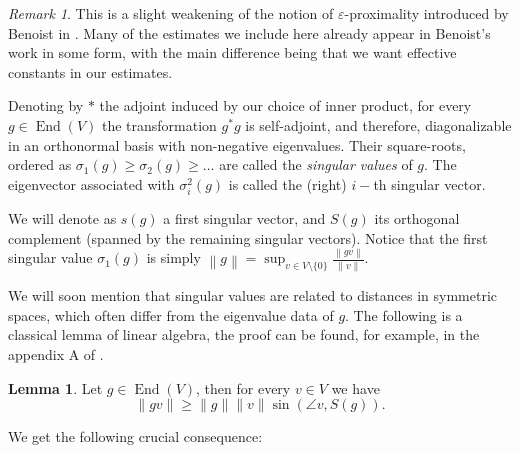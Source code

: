 \documentclass{amsart}
\DeclareMathOperator{\End}{End}
\newcommand{\norm}[1]{\left\lVert#1\right\rVert}
\theoremstyle{remark}
\newtheorem{rmk}[thm]{Remark}
\theoremstyle{definition}
\newtheorem{lem}[thm]{Lemma}
\begin{document}
\begin{rmk}
 This is a slight weakening of the notion of $\varepsilon$-proximality introduced by Benoist in \cite{benoist_actions_1996}.
 Many of the estimates we include here already appear in Benoist's work in some form, with the main difference being that we want effective constants in our estimates.
\end{rmk}

Denoting by $*$ the adjoint induced by our choice of inner product, for every $g \in \End(V)$ the transformation $g^* g$ is self-adjoint, and therefore, diagonalizable in an orthonormal basis with non-negative eigenvalues.
Their square-roots, ordered as $\sigma_1 (g) \geq \sigma_2 (g) \geq \ldots$ are called the \emph{singular values} of $g$.
The eigenvector associated with $\sigma_i^2 (g)$ is called the (right) $i-$th singular vector.

We will denote as $s (g)$ a first singular vector, and $S(g)$ its orthogonal complement (spanned by the remaining singular vectors).
Notice that the first singular value $\sigma_1 (g)$ is simply $\norm{g} = \sup_{v \in V \setminus \{0\}} \frac{\norm{gv}}{\norm{v}}$.

We will soon mention that singular values are related to distances in symmetric spaces, which often differ from the eigenvalue data of $g$.
The following is a classical lemma of linear algebra, the proof can be found, for example, in the appendix A of \cite{bochi2019anosov}.

\begin{lem}
\label{lemma:bps}
 Let $g \in \End (V)$, then for every $v \in V$ we have
    $$\|gv\| \ge \|g\|\|v\|\sin(\angle v, S(g)).$$
\end{lem}

We get the following crucial consequence:
\end{document}
